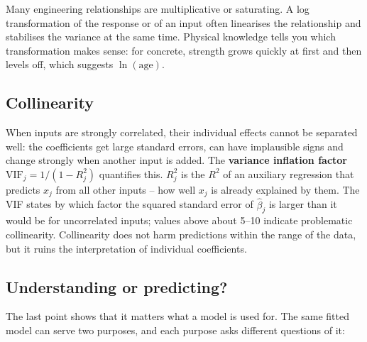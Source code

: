 \documentclass[
  letterpaper,
  DIV=11,
  numbers=noendperiod]{scrreprt}
\begin{document}
\begin{tcolorbox}[enhanced jigsaw, left=2mm, title=\textcolor{quarto-callout-tip-color}{\faLightbulb}\hspace{0.5em}{Engineering practice: transformations}, opacityback=0, breakable, rightrule=.15mm, arc=.35mm, toptitle=1mm, colbacktitle=quarto-callout-tip-color!10!white, opacitybacktitle=0.6, coltitle=black, colframe=quarto-callout-tip-color-frame, bottomrule=.15mm, leftrule=.75mm, bottomtitle=1mm, titlerule=0mm, toprule=.15mm, colback=white]

Many engineering relationships are multiplicative or saturating. A log
transformation of the response or of an input often linearises the
relationship and stabilises the variance at the same time. Physical
knowledge tells you which transformation makes sense: for concrete,
strength grows quickly at first and then levels off, which suggests
\(\ln(\text{age})\).

\end{tcolorbox}

\subsection{Collinearity}\label{collinearity}

When inputs are strongly correlated, their individual effects cannot be
separated well: the coefficients get large standard errors, can have
implausible signs and change strongly when another input is added. The
\textbf{variance inflation factor} \(\text{VIF}_j = 1/(1 - R_j^2)\)
quantifies this. \(R_j^2\) is the \(R^2\) of an auxiliary regression
that predicts \(x_j\) from all other inputs -- how well \(x_j\) is
already explained by them. The VIF states by which factor the squared
standard error of \(\hat\beta_j\) is larger than it would be for
uncorrelated inputs; values above about 5--10 indicate problematic
collinearity. Collinearity does not harm predictions within the range of
the data, but it ruins the interpretation of individual coefficients.

\subsection{Understanding or
predicting?}\label{sec-inference-prediction}

The last point shows that it matters what a model is used for. The same
fitted model can serve two purposes, and each purpose asks different
questions of it:
\end{document}

